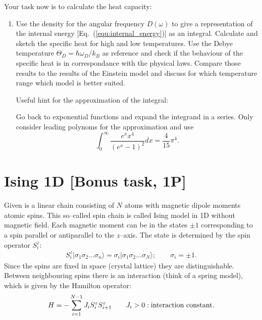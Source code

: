 \documentclass[12pt,a4paper]{article} %
\begin{document}
  

  Your task now is to calculate the heat capacity:
  \begin{enumerate}[resume]
  \item  Use the density for the angular frequency $D(\omega)$ to give a representation of the internal energy [Eq.~(\ref{equ:internal_energy})] as an integral. Calculate and sketch the specific heat for high and low temperatures. Use the Debye temperature $\Theta_D = \hbar \omega_D / k_B$ as reference and check if the behaviour of the specific heat is in correspondance with the physical laws.
  Compare those results to the results of the Einstein model and discuss for which temperature range which model is better suited.
  
  
  Useful hint for the approximation of the integral:
  
  Go back to exponential functions and expand the integrand in a series. Only consider leading polynoms for the approximation and use
  $$ \int_0^\infty \frac{e^x x^4}{(e^x-1)^2} dx = \frac{4}{15} \pi^4. $$
   \end{enumerate}


  
  

\section{Ising 1D [Bonus task, 1P]}\label{sec:Ising} Given is a linear chain consisting of $N$ atoms with magnetic dipole moments atomic spins. This so--called spin chain is called Ising model in 1D without magnetic field.
Each magnetic moment can be in the states $\pm 1$ corresponding to a spin parallel or antiparallel to the $z$--axis. The state is determined by the spin operator $S_i^z$:
\begin{align*}
 S_i^z | \sigma_1 \sigma_2 \dots \sigma_n\rangle = \sigma_i | \sigma_1 \sigma_2 \dots \sigma_N\rangle ; \qquad \sigma_i = \pm 1.
\end{align*}
Since the spins are fixed in space (crystal lattice) they are distinguishable.
Between neighbouring spins there is an interaction (think of a spring model), which is given by the Hamilton operator:
\begin{align*}
 H = -\sum_{i=1}^{N-1} J_i S_i^z S_{i+1}^z \qquad J_i > 0: \textnormal{interaction constant}.
\end{align*}
\end{document}
